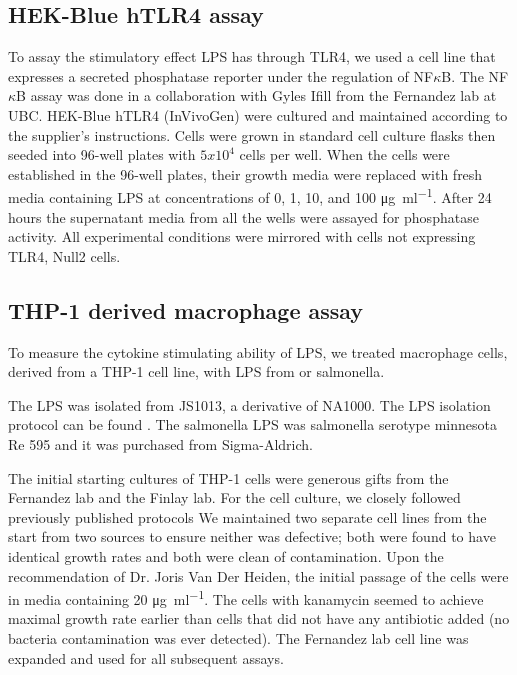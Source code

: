 \subsection{HEK-Blue hTLR4 assay}\label{sec:hek-blue-htlr4}
To assay the stimulatory effect \caulobacter{} \ac{LPS}  has through TLR4, we used a cell line that expresses a secreted phosphatase reporter under the regulation of NF$\kappa$B.
The NF$\kappa$B assay was done in a collaboration with Gyles Ifill from the Fernandez lab at UBC. HEK-Blue hTLR4\texttrademark{} (InVivoGen) were cultured and maintained according to the supplier's instructions. Cells were grown in standard cell culture flasks then seeded into 96-well plates with $5x10^{4}$ cells per well. When the cells were established in the 96-well plates, their growth media were replaced with fresh media containing \ac{LPS} at concentrations of 0, 1, 10, and 100 \si{\micro\gram\per\milli\litre}. After 24 hours the supernatant media from all the wells were assayed for phosphatase activity. All experimental conditions were mirrored with cells not expressing TLR4, Null2 cells\texttrademark{}.
      
\subsection{THP-1 derived macrophage assay} \label{sec:thp-1-derived}
To measure the cytokine stimulating ability of \caulobacter{} \ac{LPS}, we treated macrophage cells, derived from a THP-1 cell line, with \ac{LPS} from \caulobacter{} or \ac{salmonella}. 
      
The \caulobacter{} \ac{LPS} was isolated from \caulobacter{} JS1013, a derivative of NA1000. The \ac{LPS} isolation protocol can be found . The \ac{salmonella} \ac{LPS} was \ac{salmonella} serotype minnesota Re 595 and it was purchased from Sigma-Aldrich.
      
The initial starting cultures of THP-1 cells were generous gifts from the Fernandez lab and the Finlay lab. For the cell culture, we closely followed previously published protocols We maintained two separate cell lines from the start from two sources to ensure neither was defective; both were found to have identical growth rates and both were clean of contamination. Upon the recommendation of Dr. Joris Van Der Heiden, the initial passage of the cells were in media containing 20 \si{\micro\gram\per\milli\litre}. The cells with kanamycin seemed to achieve maximal growth rate earlier than cells that did not have any antibiotic added (no bacteria contamination was ever detected). The Fernandez lab cell line was expanded and used for all subsequent assays.
      
